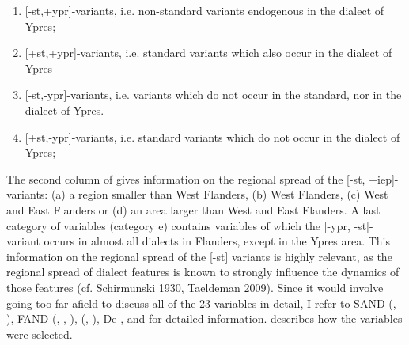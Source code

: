 \documentclass[output=paper]{LSP/langsci}
\begin{document}
\begin{enumerate}
\item {[-st,+ypr]}-variants, i.e. non-standard  variants endogenous in the dialect of Ypres;
\item {[+st,+ypr]}-variants, i.e. standard variants which also occur in the dialect of Ypres
\item {[-st,-ypr]}-variants, i.e. variants which do not occur in the standard, nor in the dialect of Ypres. 
\item {[+st,-ypr]}-variants, i.e. standard variants which do not occur in the dialect of Ypres;
\end{enumerate}
The second column of  gives information on the regional spread of the [-st, +iep]-variants: (a) a region smaller than West Flanders, (b) West Flanders, (c) West and East Flanders or (d) an area larger than West and East Flanders. A last category of variables (category e) contains variables of which the [-ypr, -st]-variant occurs in almost all dialects in Flanders, except in the Ypres area. This information on the regional spread of the [-st] variants is highly relevant, as the regional spread of dialect features is known to strongly influence the dynamics of those features (cf. Schirmunski 1930, Taeldeman 2009). Since it would involve going too far afield to discuss all of the 23 variables in detail, I refer to SAND (\citealt{barbiers_syntactische_2005}, \citealt{barbiers_syntactische_2008}), FAND (\citealt{de_wulf_fonologische_2005}, \citealt{goossens_fonologische_2000}, \citealt{goossens_fonologische_1998}), (\citealt{de_schutter_morfologische_2005}, \citealt{goeman_mand_2008}), De \citet{de_vogelaer_nederlandse_2008}, \citet{cornips_variatie_2009} and \citet{de_vogelaer_iemand_2006} for detailed information. \citet{ghyselen_stabilisering_forthcoming} describes how the variables were selected. 
\end{document}
